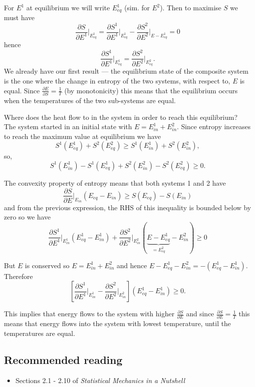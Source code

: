 For $E^1$ at equilibrium we will write $E^1_{eq}$ (sim. for $E^2$). Then to maximise $S$ we must have
$$
	\frac{\partial S}{\partial E^1}\bigg\vert_{E^1_{eq}} = \frac{\partial S^1}{\partial E^1}\bigg\vert_{E^1_{eq}} - \frac{\partial S^2}{\partial E^2}\bigg\vert_{E-E^1_{eq}}=0
$$
hence
$$
	\frac{\partial S^1}{\partial E^1}\vert_{E^1_{eq}} = \frac{\partial S^2}{\partial E^2}\vert_{E_{eq}^2}.
$$ We already have our first result --- the equilibrium state of the composite system is the one where the change in entropy of the two systems, with respect to, $E$ is equal. Since $\frac{\partial E}{\partial S} = \frac{1}{T}$ (by monotonicity) this means that the equilibrium occurs when the temperatures of the two sub-systems are equal.

Where does the heat flow to in the system in order to reach this equilibrium? The system started in an initial state with $E = E^1_{in}+E^2_{in}$. Since entropy increases to reach the maximum value at equilibrium we have 
$$
	S^1(E^1_{eq}) + S^2(E^2_{eq}) \geq S^1(E^1_{in}) + S^2(E^2_{in}),
$$ 
so,
$$ 
	S^1(E^1_{in}) - S^1(E^1_{eq})  +  S^2(E^2_{in}) - S^2(E^2_{eq})\geq 0.
$$

The convexity property of entropy means that both systems  1 and 2 have 
$$
	\frac{\partial S}{\partial E}\vert_{E_{in}}(E_{eq}-E_{in})\geq S(E_{eq})-S(E_{in})
$$ 
and from the previous expression, the RHS of this inequality is bounded below by zero so we have
$$
	\frac{\partial S^1}{\partial E^1}\bigg\vert_{E^1_{in}}(E_{eq}^1-E_{in}^1) + \frac{\partial S^2}{\partial E^2}\bigg\vert_{E^2_{in}}(\underbrace{E-E_{eq}^1}_{=E^2_{eq}}-E_{in}^2)\geq0
$$

But $E$ is conserved so $E=E^1_{in}+E^2_{in}$ and hence $E-E^1_{eq}-E^2_{in} = -(E^1_{eq}-E^1_{in})$. Therefore
$$
	\left[\frac{\partial S^1}{\partial E^1}\bigg\vert_{E^1_{in}} - \frac{\partial S^2}{\partial E^2}\bigg\vert_{E^2_{in}}\right]\left(E^1_{eq}-E^1_{in}\right)\geq 0.
$$

This implies that energy flows to the  system with higher $\frac{\partial S}{\partial E}$ and since $\frac{\partial S}{\partial E}= \frac{1}{T}$ this means that energy flows into the system with lowest temperature, until the temperatures are equal.

\subsection{Recommended reading}
\begin{itemize}
	\item Sections 2.1 - 2.10 of \emph{Statistical Mechanics in a Nutshell}
\end{itemize}

